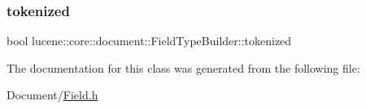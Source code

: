 \subsubsection{\texorpdfstring{tokenized}{tokenized}}
{\footnotesize\ttfamily bool lucene\+::core\+::document\+::\+Field\+Type\+Builder\+::tokenized\hspace{0.3cm}{\ttfamily [private]}}



The documentation for this class was generated from the following file\+:\begin{DoxyCompactItemize}
\item 
Document/\mbox{\hyperlink{Document_2Field_8h}{Field.\+h}}\end{DoxyCompactItemize}
